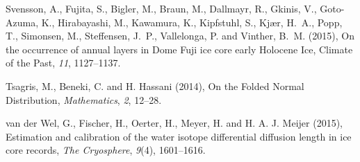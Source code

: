 \documentclass[draft, jgrga]{AGUTeX}
\begin{document}
\begin{article}
\begin{thebibliography}{}
Svensson, A., Fujita, S., Bigler, M., Braun, M., Dallmayr, R., Gkinis, V.,
Goto-Azuma, K., Hirabayashi, M., Kawamura, K., Kipfstuhl, S., Kjær, H.~A.,
Popp, T., Simonsen, M., Steffensen, J.~P., Vallelonga, P. and Vinther, B.~M. (2015),
{On the occurrence of annual layers in Dome Fuji ice core early Holocene Ice},
{Climate of	the Past}, \textit{11}, 1127--1137.


Tsagris, M., Beneki, C. and H. Hassani (2014),
{On the Folded Normal Distribution},
\textit{Mathematics}, \textit{2}, 12--28.

van der Wel, G., Fischer, H., Oerter, H., Meyer, H. and H. A. J. Meijer (2015),
Estimation and calibration of the water isotope differential diffusion length in ice core records,
\textit{The Cryosphere}, \textit{9}(4), 1601--1616.

%











%
%
%

%


\end{thebibliography}
\end{article}
\end{document}
